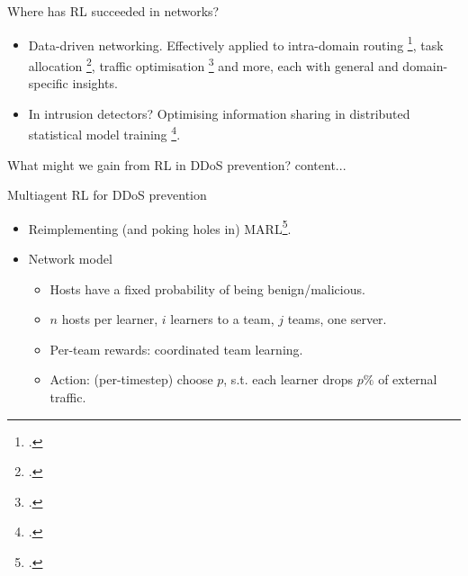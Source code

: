 \documentclass[aspectratio=169,xcolor={dvipsnames}
,hide notes
]{beamer}
\begin{document}
\begin{frame}{Where has RL succeeded in networks?}
	
	\begin{itemize}
		\item \alert{Data-driven networking.} Effectively applied to intra-domain routing \footcite{DBLP:conf/hotnets/ValadarskySST17}, task allocation \footcite{DBLP:conf/hotnets/MaoAMK16}, traffic optimisation \footcite{DBLP:conf/sigcomm/ChenL0L18} and more, each with general and domain-specific insights.
		
		\item \alert{In intrusion detectors?} Optimising information sharing in distributed statistical model training \footcite{DBLP:conf/paisi/XuSH07}.
	\end{itemize}
\end{frame}

\begin{frame}{What might we gain from RL in DDoS prevention?}
content...
\end{frame}


\begin{frame}{Multiagent RL for DDoS prevention}
%	
%	
%
	
	\begin{itemize}
		\item Reimplementing (and poking holes in) MARL\footcite{DBLP:journals/eaai/MalialisK15}.
		
		\item Network model
		\begin{itemize}
			\item Hosts have a fixed probability of being benign/malicious.
			\item $n$ hosts per learner, $i$ learners to a team, $j$ teams, one server.
			\item Per-team rewards: \alert{coordinated team learning}.
			\item Action: (per-timestep) choose $p$, s.t. each learner drops $p\%$ of external traffic.
		\end{itemize}
	\end{itemize}
\end{frame}
\end{document}
